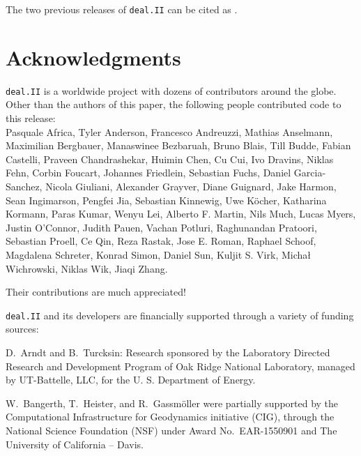 \documentclass{ansarticle-preprint}
\newcommand{\specialword}[1]{\texttt{#1}}
\newcommand{\dealii}{{\specialword{deal.II}}\xspace}
\begin{document}
The two previous releases of \dealii can be cited as
\cite{dealII92,dealII93}.


\section{Acknowledgments}

\dealii is a worldwide project with dozens of contributors around the
globe. Other than the authors of this paper, the following people
contributed code to this release:\\
%
%

Pasquale      Africa,
Tyler         Anderson,
Francesco     Andreuzzi,
Mathias       Anselmann,
Maximilian    Bergbauer,
Manaswinee    Bezbaruah,
Bruno         Blais,
Till          Budde,
Fabian        Castelli,
Praveen       Chandrashekar,
Huimin        Chen,
Cu            Cui,
Ivo           Dravins,
Niklas        Fehn,
Corbin        Foucart,
Johannes      Friedlein,
Sebastian     Fuchs,
Daniel        Garcia-Sanchez,
Nicola        Giuliani,
Alexander     Grayver,
Diane         Guignard,
Jake          Harmon,
Sean          Ingimarson,
Pengfei       Jia,
Sebastian     Kinnewig,
Uwe           K{\"o}cher,
Katharina     Kormann,
Paras         Kumar,
Wenyu         Lei,
Alberto F.    Martin,
Nils          Much,
Lucas         Myers,
Justin        O'Connor,
Judith        Pauen,
Vachan        Potluri,
Raghunandan   Pratoori,
Sebastian     Proell,
Ce            Qin,
Reza          Rastak,
Jose E.       Roman,
Raphael       Schoof,
Magdalena     Schreter,
Konrad        Simon,
Daniel        Sun,
Kuljit S.     Virk,
Michał        Wichrowski,
Niklas        Wik,
Jiaqi         Zhang.


Their contributions are much appreciated!


\bigskip

\dealii and its developers are financially supported through a
variety of funding sources:


D.~Arndt and B.~Turcksin: Research sponsored by the Laboratory Directed Research and
Development Program of Oak Ridge National Laboratory, managed by UT-Battelle,
LLC, for the U. S. Department of Energy.

W.~Bangerth, T.~Heister, and R.~Gassm{\"o}ller were partially
supported by the Computational Infrastructure for Geodynamics initiative
(CIG), through the National Science Foundation (NSF) under Award
No.~EAR-1550901 and The University of California -- Davis.
\end{document}
